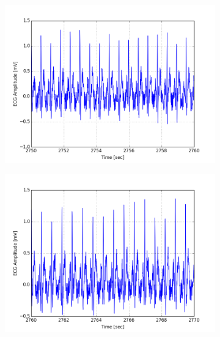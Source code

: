 \documentclass[paper=a4, fontsize=11pt]{scrartcl}
\numberwithin{equation}{section}		%
\numberwithin{figure}{section}			%
\numberwithin{table}{section}		    %
\begin{document}
\begin{appendices}
\begin{figure}[H]
	\centering
	\begin{subfigure}[b]{0.3\textwidth}
		\includegraphics[width=\textwidth]{sim/ecg_46}
	\end{subfigure}
	\begin{subfigure}[b]{0.3\textwidth}
		\includegraphics[width=\textwidth]{sim/ecg_47}
	\end{subfigure}
	\begin{subfigure}[b]{0.3\textwidth}

\end{subfigure}
\end{figure}
\end{appendices}
\end{document}
